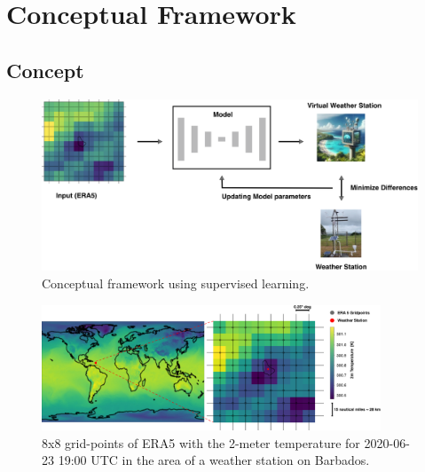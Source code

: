 \section{Conceptual Framework}
\label{sec: design}

\subsection{Concept}

\begin{figure}
    \centering
    \includegraphics[width=\textwidth]{resources/images/supervised_learning.png}
    \caption{Conceptual framework using supervised learning.}
    \label{fig: supervised_learning}
\end{figure}

\begin{figure}
    \centering
    \includegraphics[width=0.9\textwidth]{resources/images/ERA5_tas_around_barbados.png}
    \caption{8x8 grid-points of ERA5 with the 2-meter temperature 
    for 2020-06-23 19:00 UTC  in the area of a weather station on Barbados.}    
    \label{fig: barbados}
\end{figure}

